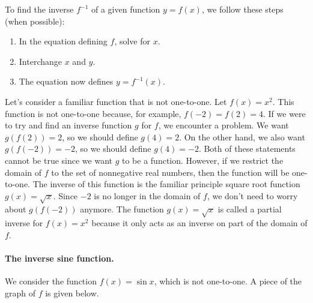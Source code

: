To find the inverse $f^{-1}$ of a given function $y=f(x)$, we follow these steps (when possible):
\begin{enumerate}
\item In the equation defining $f$, solve for $x$.
\item Interchange $x$ and $y$.
\item The equation now defines $y=f^{-1}(x)$.
\end{enumerate}


Let's consider a familiar function that is not one-to-one. Let $f(x)=x^2$. This function is not one-to-one because, for example, $f(-2)=f(2)=4$. If we were to try and find an inverse function $g$ for $f$, we encounter a problem. We want $g(f(2))=2$, so we should define $g(4)=2$. On the other hand, we also want $g(f(-2))=-2$, so we should define $g(4)=-2$. Both of these statements cannot be true since we want $g$ to be a function. However, if we restrict the domain of $f$ to the set of nonnegative real numbers, then the function will be one-to-one. The inverse of this function is the familiar principle square root function $g(x)=\sqrt x$. Since $-2$ is no longer in the domain of $f$, we don't need to worry about $g(f(-2))$ anymore. The function $g(x)=\sqrt x$ is called a partial inverse for $f(x)=x^2$ because it only acts as an inverse on part of the domain of $f$.

\paragraph{The inverse sine function.} We consider the function $f(x)=\sin x$, which is not one-to-one. A piece of the graph of $f$ is given below.

